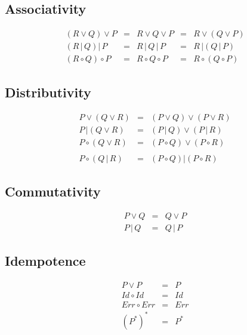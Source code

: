 \subsection{Associativity}
\begin{equation*}
\begin{array}{rcccl}
  \left( R \vee Q \right) \vee P & = & R \vee Q \vee P & = & R \vee \left( Q \vee P \right) \\
  \left( R \,|\, Q \right) |\, P & = & R \,|\, Q \,|\, P & = & R \,| \left( Q \,|\, P \right) \\
  \left( R \circ Q \right) \circ P & = & R \circ Q \circ P & = & R \circ \left( Q \circ P \right)
\end{array}
\end{equation*}

\subsection{Distributivity}
\begin{eqnarray*}
  P \vee \left( Q \vee R \right) & = & \left( P \vee Q \right) \vee \left( P \vee R \right) \\
  P \,| \left( Q \vee R \right) & = & \left( P \,|\, Q \right) \vee \left( P \,|\, R \right) \\
  P \circ \left( Q \vee R \right) & = & \left( P \circ Q \right) \vee \left( P \circ R \right) \\
  & & \\
  P \circ \left( Q \,|\, R \right) & = & \left( P \circ Q \right) | \left( P \circ R \right)
\end{eqnarray*}

\subsection{Commutativity}
\begin{eqnarray*}
  P \vee Q & = & Q \vee P \\
  P \,|\, Q & = & Q \,|\, P
\end{eqnarray*}

\subsection{Idempotence}
\begin{eqnarray*}
  P \vee P & = & P \\
  Id \circ Id & = & Id \\
  Err \circ Err & = & Err \\
  (P^*)^* & = & P^*
\end{eqnarray*}

